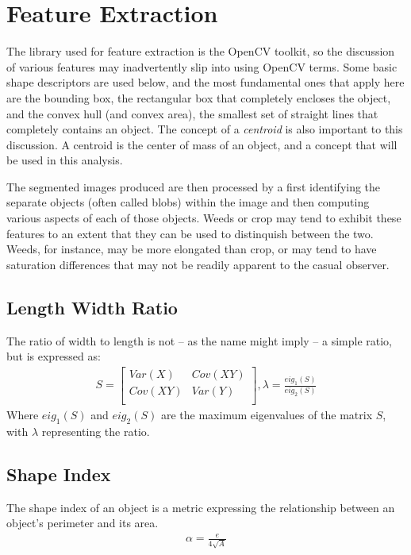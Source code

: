 \documentclass[letterpaper]{article}
\begin{document}
{\section{Feature Extraction}
The library used for feature extraction is the OpenCV toolkit, so the discussion of various features may inadvertently slip into using OpenCV terms. Some basic shape descriptors are used below, and the most fundamental ones that apply here are the bounding box, the rectangular box that completely encloses the object, and the convex hull (and convex area), the smallest set of straight lines that completely contains an object. The concept of a {\it centroid} is also important to this discussion.  A centroid is the center of mass of an object, and a concept that will be used in this analysis.

The segmented images produced are then processed by a first identifying the separate objects (often called blobs) within the image and then computing various aspects of each of those objects. Weeds or crop may tend to exhibit these features to an extent that they can be used to distinquish between the two.  Weeds, for instance, may be more elongated than crop, or may tend to have saturation differences that may not be readily apparent to the casual observer.
\subsection{Length Width Ratio}
The ratio of width to length is not -- as the name might imply -- a simple ratio, but is expressed as:
\begin{eqnarray*}
S = 
	\begin{bmatrix}
	Var(X) & Cov(XY) \\[0.3em]
	Cov(XY) & Var(Y) \\[0.3em]
	\end{bmatrix},
\lambda = \frac {eig_{1}(S)} {eig_{2}(S)}
\end{eqnarray*}
Where $eig_{1}(S)$ and $eig_{2}(S)$ are the maximum eigenvalues of the matrix $S$, with $\lambda$ representing the ratio. \cite{Lin2017-xq}
\subsection{Shape Index}
The shape index of an object is a metric expressing the relationship between an object's perimeter and its area.
\begin{eqnarray*}
\alpha = \frac {e} {4 \sqrt{A}}
\end{eqnarray*}

}
\end{document}
